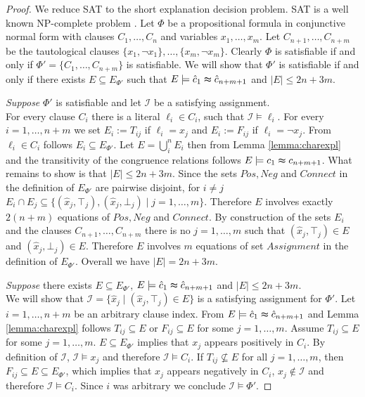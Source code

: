 \begin{proof}

We reduce SAT to the short explanation decision problem.
SAT is a well known NP-complete problem \cite{Biere2009}.
Let $\Phi$ be a propositional formula in conjunctive normal form with clauses $C_1,\ldots,C_n$ and variables $x_1,\ldots,x_m$.
Let $C_{n+1},\ldots,C_{n+m}$ be the tautological clauses $\{x_1, \neg x_1\},\ldots,\{x_m,\neg x_m\}$.
Clearly $\Phi$ is satisfiable if and only if $\Phi' = \{C_1,\ldots,C_{n+m}\}$ is satisfiable.
We will show that $\Phi'$ is satisfiable if and only if there exists $E \subseteq E_{\Phi'}$ such that $E \models \hat{c}_1 \thickapprox \hat{c}_{n+m+1}$ and $|E| \leq 2n + 3m$.

\emph{Suppose} $\Phi'$ is satisfiable and let $\mathcal{I}$ be a satisfying assignment.\\
For every clause $C_i$ there is a literal $\ell_i \in C_i$, such that $\mathcal{I} \models \ell_i$.
For every $i = 1,\ldots,n+m$ we set $E_i:= T_{ij}$ if $\ell_i = x_j$ and $E_i:= F_{ij}$ if $\ell_i = \neg x_j$.
From $\ell_i \in C_i$ follows $E_i \subseteq E_{\Phi'}$.
Let $E = \bigcup_i^n E_i$ then from Lemma \ref{lemma:charexpl} and the transitivity of the congruence relations follows $E \models c_1 \thickapprox c_{n+m+1}$.
What remains to show is that $|E| \leq 2n + 3m$.
Since the sets $Pos, Neg$ and $Connect$ in the definition of $E_{\Phi'}$ are pairwise disjoint, for $i \neq j$ $E_i \cap E_j \subseteq \{(\hat{x}_j,\top_j),(\hat{x}_j,\bot_j) \mid j = 1,\ldots,m\}$.
Therefore $E$ involves exactly $2(n+m)$ equations of $Pos, Neg$ and $Connect$.
By construction of the sets $E_i$ and the clauses $C_{n+1},\ldots,C_{n+m}$ there is no $j = 1,\ldots,m$ such that $(\hat{x}_j,\top_j) \in E$ and $(\hat{x}_j,\bot_j) \in E$.
Therefore $E$ involves $m$ equations of set $Assignment$ in the definition of $E_{\Phi'}$.
Overall we have $|E| = 2n + 3m$.

\emph{Suppose} there exists $E \subseteq E_{\Phi'}$, $E \models \hat{c}_1 \thickapprox \hat{c}_{n+m+1}$ and $|E| \leq 2n + 3m$.\\
We will show that $\mathcal{I} = \{\hat{x}_j \mid (\hat{x}_j,\top_j) \in E\}$ is a satisfying assignment for $\Phi'$.
Let $i = 1,\ldots,n+m$ be an arbitrary clause index.
From $E \models \hat{c}_1 \thickapprox \hat{c}_{n+m+1}$ and Lemma \ref{lemma:charexpl} follows $T_{ij} \subseteq E$ or $F_{ij} \subseteq E$ for some $j=1,\ldots,m$.
Assume $T_{ij} \subseteq E$ for some $j = 1,\ldots,m$.
$E \subseteq E_{\Phi'}$ implies that $x_j$ appears positively in $C_i$. 
By definition of $\mathcal{I}$, $\mathcal{I} \models x_j$ and therefore $\mathcal{I} \models C_i$.
If $T_{ij} \nsubseteq E$ for all $j = 1,\ldots,m$, then $F_{ij} \subseteq E \subseteq E_{\Phi'}$, which implies that $x_j$ appears negatively in $C_i$, $x_j \notin \mathcal{I}$ and therefore $\mathcal{I} \models C_i$. Since $i$ was arbitrary we conclude $\mathcal{I} \models \Phi'$.

\end{proof}

